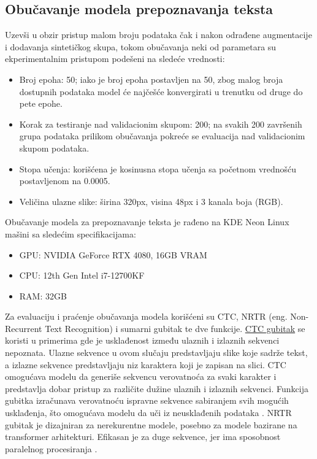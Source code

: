 \documentclass[a4paper,12pt]{article}
\begin{document}
	\subsection{Obučavanje modela prepoznavanja teksta}
	Uzevši u obzir pristup malom broju podataka čak i nakon odrađene augmentacije i dodavanja sintetičkog skupa, tokom obučavanja neki od parametara su ekperimentalnim pristupom podešeni na sledeće vrednosti:
	\begin{itemize}
		\item Broj epoha: 50; iako je broj epoha postavljen na 50, zbog malog broja dostupnih podataka model će najčešće konvergirati u trenutku od druge do pete epohe.
		\item Korak za testiranje nad validacionim skupom: 200; na svakih 200 završenih grupa podataka prilikom obučavanja pokreće se evaluacija nad validacionim skupom podataka.
		\item Stopa učenja: korišćena je kosinusna stopa učenja sa početnom vrednošću postavljenom na 0.0005.
		\item Veličina ulazne slike: širina 320px, visina 48px i 3 kanala boja (RGB).
	\end{itemize}
	
	Obučavanje modela za prepoznavanje teksta je rađeno na KDE Neon Linux mašini sa sledećim specifikacijama:
	\begin{itemize}
		\item GPU: NVIDIA GeForce RTX 4080, 16GB VRAM
		\item CPU: 12th Gen Intel i7-12700KF
		\item RAM: 32GB
	\end{itemize}

	Za evaluaciju i praćenje obučavanja modela korišćeni su CTC, NRTR (eng. Non-Recurrent Text Recognition) i sumarni gubitak te dve funkcije. \href{https://paperswithcode.com/method/ctc-loss}{CTC gubitak} se koristi u primerima gde je usklađenost između ulaznih i izlaznih sekvenci nepoznata. Ulazne sekvence u ovom slučaju predstavljaju slike koje sadrže tekst, a izlazne sekvence predstavljaju niz karaktera koji je zapisan na slici. CTC omogućava modelu da generiše sekvencu verovatnoća za svaki karakter i predstavlja dobar pristup za različite dužine ulaznih i izlaznih sekvenci. Funkcija gubitka izračunava verovatnoću ispravne sekvence sabiranjem svih mogućih usklađenja, što omogućava modelu da uči iz neusklađenih podataka \cite{inproceedings}. NRTR gubitak je dizajniran za nerekurentne modele, posebno za modele bazirane na transformer arhitekturi. Efikasan je za duge sekvence, jer ima sposobnost paralelnog procesiranja \cite{hu2020gtcguidedtrainingctc}.
	
\end{document}
